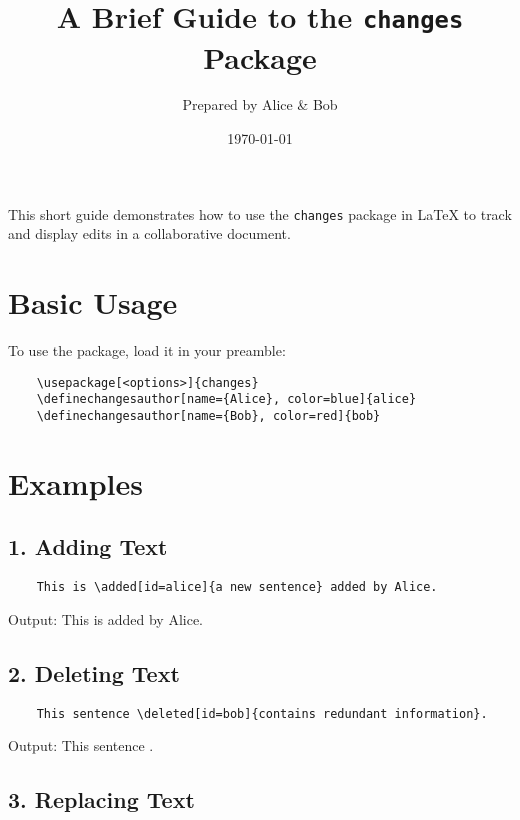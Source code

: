\documentclass{article}
\title{A Brief Guide to the \texttt{changes} Package}
\author{Prepared by Alice \& Bob}
\date{\today}
\begin{document}
\maketitle

This short guide demonstrates how to use the \texttt{changes} package in \LaTeX{} to track and display edits in a collaborative document.

\section*{Basic Usage}

To use the package, load it in your preamble:

\begin{Verbatim}
	\usepackage[<options>]{changes}
	\definechangesauthor[name={Alice}, color=blue]{alice}
	\definechangesauthor[name={Bob}, color=red]{bob}
\end{Verbatim}

\section*{Examples}

\subsection*{1. Adding Text}

\begin{Verbatim}
	This is \added[id=alice]{a new sentence} added by Alice.
\end{Verbatim}

Output:
This is  added by Alice.

\vspace{1em}

\subsection*{2. Deleting Text}

\begin{Verbatim}
	This sentence \deleted[id=bob]{contains redundant information}.
\end{Verbatim}

Output:
This sentence .

\vspace{1em}

\subsection*{3. Replacing Text}
\end{document}
